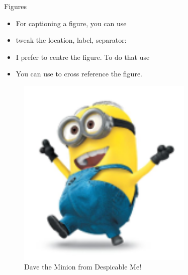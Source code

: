 \documentclass[10pt,times]{beamer}
\begin{document}
\begin{frame}[fragile]{Figures}
\begin{itemize}
\item For captioning a figure, you can use 

\item tweak the location, label, separator: 

\item I prefer to centre the figure. To do that use 

\item You can use  to cross reference the figure.

\end{itemize}
\begin{exampletwoup}
\begin{figure}
\centering
\includegraphics[width=0.75\textwidth]
                           {figs/minion}
\caption[Minion]{
	Dave the Minion from Despicable Me!}
\label{fig:minion}
\end{figure}
\end{exampletwoup}
\end{frame}
\end{document}
